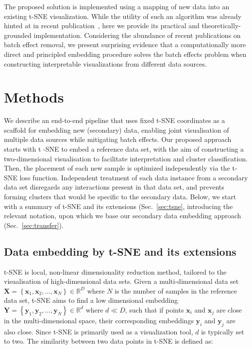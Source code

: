 \documentclass[runningheads]{llncs}
\begin{document}
The proposed solution is implemented using a mapping of
new data into an existing t-SNE visualization. While the
utility of such an algorithm was already hinted at in recent
publication~\cite{art_of_using_tsne}, here we provide its practical and
theoretically-grounded implementation. Considering the abundance of recent
publications on batch effect removal, we present surprising evidence that a
computationally more direct and principled embedding procedure solves the batch
effects problem when constructing interpretable visualizations from different
data sources.


\section{Methods}

We describe an end-to-end pipeline that uses fixed t-SNE coordinates as a scaffold for
embedding new (secondary) data, enabling joint visualisation of multiple data sources
while mitigating batch effects. Our proposed approach starts with t\nobreakdash
-SNE to embed a reference data set, with the aim of constructing a
two-dimensional visualisation to facilitate interpretation and cluster
classification. Then, the placement of each new sample is
optimized independently via the
t\nobreakdash -SNE loss function. Independent treatment of each data instance from
a secondary data set disregards any interactions present in that data set, and
prevents forming clusters that would be specific to the secondary data. Below, we start
with a summary of t-SNE and its extensions (Sec.~\ref{sec:tsne}, introducing
the relevant notation, upon which we base our secondary data embedding
approach (Sec.~\ref{sec:transfer}).


\subsection{Data embedding by t-SNE and its extensions\label{sec:tsne}}

t-SNE is local, non-linear dimensionality reduction method, tailored to the visualisation of
high-dimensional data sets. Given a multi-dimensional data set $\mathbf{X} =
\left \{ \mathbf{x}_1, \mathbf{x}_2, \dots, \mathbf{x}_N \right \} \in
\mathbb{R}^D$ where $N$ is the number of samples in the reference data set,
t-SNE aims to find a low dimensional embedding $\mathbf{Y} = \left \{
\mathbf{y}_1, \mathbf{y}_2, \dots, \mathbf{y}_N \right \} \in \mathbb{R}^d$
where $d \ll D$, such that if points $\mathbf{x}_i$ and $\mathbf{x}_j$ are
close in the multi-dimensional space, their corresponding embeddings
$\mathbf{y}_i$ and $\mathbf{y}_j$ are also close. Since t-SNE is primarily used
as a visualization tool, $d$ is typically set to two. The similarity between
two data points in t-SNE is defined as:
\end{document}
